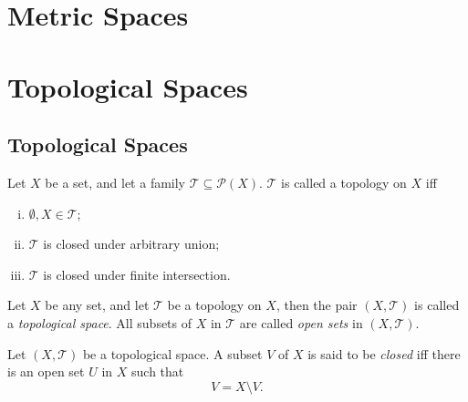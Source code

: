\chapter{Metric Spaces}



\chapter{Topological Spaces}


\section{Topological Spaces}



\begin{definition}
	[topology]
	\label{def: topology}
	Let $X$ be a set, and let a family $\mathcal T \subseteq \mathcal P(X)$. $\mathcal T$ is called a topology on $X$ iff
	\begin{enumerate}[(i)]
		\item $\emptyset, X \in \mathcal T$;
		\item $\mathcal T$ is closed under arbitrary union;
		\item $\mathcal T$ is closed under finite intersection.
	\end{enumerate}
\end{definition}


\begin{definition}
	\label{def: topological spaces}
	Let $X$ be any set, and let $\mathcal T$ be a topology on $X$, then the pair $(X, \mathcal T)$ is called a \textit{topological space}. All subsets of $X$ in $\mathcal T$ are called \textit{open sets} in $(X, \mathcal T)$.
\end{definition}


\begin{definition}
	\label{def: closed sets}
	Let $(X, \mathcal T)$ be a topological space. A subset $V$ of $X$ is said to be \textit{closed} iff there is an open set $U$ in $X$ such that
	$$
	V = X \setminus V.
	$$
\end{definition}


